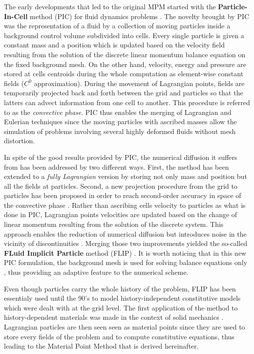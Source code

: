 The early developments that led to the original MPM started with the \textbf{Particle-In-Cell} method (PIC) for fluid dynamics problems \cite{PIC}. The novelty brought by PIC was the representation of a fluid by a collection of moving particles inside a background control volume subdivided into cells. Every single particle is given a constant mass and a position which is updated based on the velocity field resulting from the solution of the discrete linear momentum balance equation on the fixed background mesh. On the other hand, velocity, energy and pressure are stored at cells centroids during the whole computation as element-wise constant fields ($C^0$ approximation). 
During the movement of Lagrangian points, fields are temporarily projected back and forth between the grid and particles so that the latters can advect information from one cell to another. This procedure is referred to as the \textit{convective phase}. PIC thus enables the merging of Lagrangian and Eulerian techniques since the moving particles with ascribed masses allow the simulation of problems involving several highly deformed fluids without mesh distortion.

In spite of the good results provided by PIC, the numerical diffusion it suffers from has been addressed by two different ways. First, the method has been extended to a \textit{fully Lagrangian} version \cite{McCrory_FLIP} by storing not only mass and position but all the fields at particles. Second, a new projection procedure from the grid to particles has been proposed in order to reach second-order accuracy in space of the convective phase \cite{PIC_Nishiguchi}. 
Rather than ascribing cells velocity to particles as what is done in PIC, Lagrangian points velocities are updated based on the change of linear momentum resulting from the solution of the discrete system. This approach enables the reduction of numerical diffusion but introduces noise in the vicinity of discontinuities \cite{Mass_Flip}.
Merging those two improvements yielded the so-called \textbf{FLuid Implicit Particle} method (FLIP) \cite{FLIP}. It is worth noticing that in this new PIC formulation, the background mesh is used for solving balance equations only , thus providing an adaptive feature to the numerical scheme. 


Even though particles carry the whole history of the problem, FLIP has been essentialy used until the 90's to model history-independent constitutive models which were dealt with at the grid level. The first application of the method to history-dependent materials was made in the context of solid mechanics \cite{Sulsky94}. Lagrangian particles are then seen seen as material points since they are used to store every fields of the problem and to compute constitutive equations, thus leading to the Material Point Method that is derived hereinafter. 

